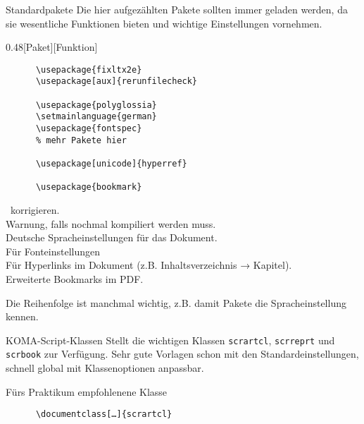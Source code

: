 \begin{frame}[fragile]{Standardpakete}
  Die hier aufgezählten Pakete sollten immer geladen werden, da sie wesentliche Funktionen bieten und wichtige Einstellungen vornehmen.
  \begin{CodeExample}{0.48}[Paket][Funktion]
    \begin{lstlisting}
      \usepackage{fixltx2e}
      \usepackage[aux]{rerunfilecheck}

      \usepackage{polyglossia}
      \setmainlanguage{german}
      \usepackage{fontspec}
      % mehr Pakete hier

      \usepackage[unicode]{hyperref}

      \usepackage{bookmark}
    \end{lstlisting}
  \CodeResult
    \LaTeXe\ korrigieren. \\
    Warnung, falls nochmal kompiliert werden muss. \\
    Deutsche Spracheinstellungen für das Dokument. \\
    Für Fonteinstellungen \\[2\baselineskip]
    Für Hyperlinks im Dokument (z.B. Inhaltsverzeichnis → Kapitel). \\
    Erweiterte Bookmarks im PDF.
  \end{CodeExample}

  \vspace{5pt}
  Die Reihenfolge ist manchmal wichtig, z.B. damit Pakete die Spracheinstellung kennen.
\end{frame}

\begin{frame}[fragile]{
  KOMA-Script-Klassen
  \hfill{}
}
  Stellt die wichtigen Klassen \texttt{scrartcl}, \texttt{scrreprt} und \texttt{scrbook} zur Verfügung.
  Sehr gute Vorlagen schon mit den Standardeinstellungen, schnell global mit Klassenoptionen anpassbar.
  \begin{block}{Fürs Praktikum empfohlenene Klasse}
    \begin{lstlisting}
      \documentclass[…]{scrartcl}
    \end{lstlisting}
  \end{block}
\end{frame}

